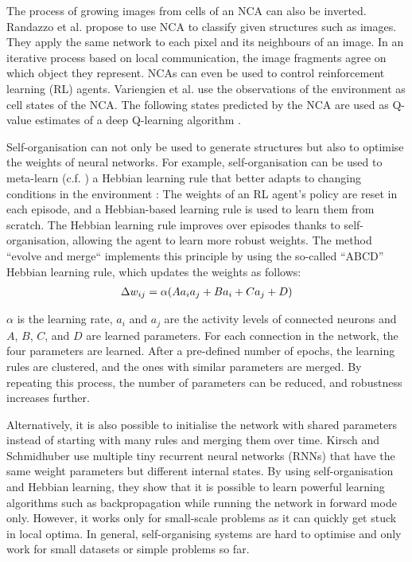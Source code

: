 The process of growing images from cells of an NCA can also be inverted.
Randazzo et al.  propose to use NCA to classify given structures such as images.
They apply the same network to each pixel and its neighbours of an image.
In an iterative process based on local communication, the image fragments agree on which object they represent.
NCAs can even be used to control reinforcement learning (RL) agents.
Variengien et al.  use the observations of the environment as cell states of the NCA. The following states predicted by the NCA are used as Q-value estimates of a deep Q-learning algorithm .

Self-organisation can not only be used to generate structures but also to optimise the weights of neural networks.
For example, self-organisation can be used to meta-learn (c.f. ) a Hebbian learning rule that better adapts to changing conditions in the environment :
The weights of an RL agent's policy are reset in each episode, and a Hebbian-based learning rule is used to learn them from scratch.
The Hebbian learning rule improves over episodes thanks to self-organisation, allowing the agent to learn more robust weights.
The method ``evolve and merge``  implements this principle by using the so-called ``ABCD'' Hebbian learning rule, which updates the weights as follows:
\begin{align}\eqlbl{abcd_hebb_rule_risi}
	\Delta w_{ij} = \alpha (A a_i a_j + B a_i + C a_j + D)
\end{align}%

$\alpha$ is the learning rate, $a_i$ and $a_j$ are the activity levels of connected neurons and $A$, $B$, $C$, and $D$ are learned parameters.
For each connection in the network, the four parameters are learned.
After a pre-defined number of epochs, the learning rules are clustered, and the ones with similar parameters are merged.
By repeating this process, the number of parameters can be reduced, and robustness increases further.

Alternatively, it is also possible to initialise the network with shared parameters instead of starting with many rules and merging them over time.
Kirsch and Schmidhuber  use multiple tiny recurrent neural networks (RNNs) that have the same weight parameters but different internal states.
By using self-organisation and Hebbian learning, they show that it is possible to learn powerful learning algorithms such as backpropagation while running the network in forward mode only.
However, it works only for small-scale problems as it can quickly get stuck in local optima.
In general, self-organising systems are hard to optimise and only work for small datasets or simple problems so far.

